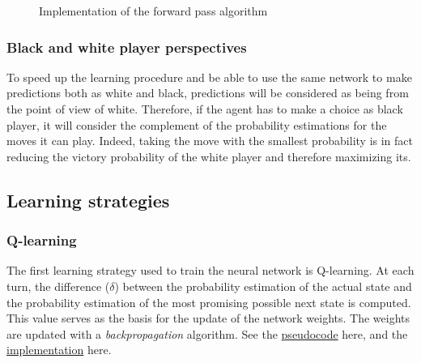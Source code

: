 \documentclass{article}
\begin{document}
\begin{figure}[H]
    \begin{center}
      \label{code:fp-code}
      \caption{Implementation of the forward pass algorithm}
    \end{center}
\end{figure}

\subsubsection{Black and white player perspectives}

 To speed up the learning procedure and be able to use the same network to make predictions both as white and black, predictions will be considered as being from the point of view of white. Therefore, if the agent has to make a choice as black player, it will consider the complement of the probability estimations for the moves it can play. Indeed, taking the move with the smallest probability is in fact reducing the victory probability of the white player and therefore maximizing its.

\subsection{Learning strategies}

\subsubsection{Q-learning}

The first learning strategy used to train the neural network is Q-learning. At each turn, the difference ($\delta$) between the probability estimation of the actual state and the probability estimation of the most promising possible next state is computed. This value serves as the basis for the update of the network weights. The weights are updated with a \textit{backpropagation} algorithm. See the \hyperref[alg:backprop]{pseudocode} here, and the \hyperref[code:bp-code]{implementation} here.
\end{document}
